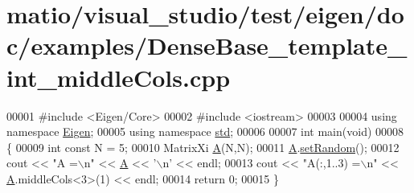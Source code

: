 \hypertarget{matio_2visual__studio_2test_2eigen_2doc_2examples_2_dense_base__template__int__middle_cols_8cpp_source}{}\section{matio/visual\+\_\+studio/test/eigen/doc/examples/\+Dense\+Base\+\_\+template\+\_\+int\+\_\+middle\+Cols.cpp}
\label{matio_2visual__studio_2test_2eigen_2doc_2examples_2_dense_base__template__int__middle_cols_8cpp_source}

\begin{DoxyCode}
00001 \textcolor{preprocessor}{#include <Eigen/Core>}
00002 \textcolor{preprocessor}{#include <iostream>}
00003 
00004 \textcolor{keyword}{using namespace }\hyperlink{namespace_eigen}{Eigen};
00005 \textcolor{keyword}{using namespace }\hyperlink{namespacestd}{std};
00006 
00007 \textcolor{keywordtype}{int} main(\textcolor{keywordtype}{void})
00008 \{
00009     \textcolor{keywordtype}{int} \textcolor{keyword}{const} N = 5;
00010     MatrixXi \hyperlink{group___core___module_class_eigen_1_1_matrix}{A}(N,N);
00011     \hyperlink{group___core___module_class_eigen_1_1_matrix}{A}.\hyperlink{class_eigen_1_1_plain_object_base_af0e576a0e1aefc9ee346de44cc352ba3}{setRandom}();
00012     cout << \textcolor{stringliteral}{"A =\(\backslash\)n"} << \hyperlink{group___core___module_class_eigen_1_1_matrix}{A} << \textcolor{charliteral}{'\(\backslash\)n'} << endl;
00013     cout << \textcolor{stringliteral}{"A(:,1..3) =\(\backslash\)n"} << \hyperlink{group___core___module_class_eigen_1_1_matrix}{A}.middleCols<3>(1) << endl;
00014     \textcolor{keywordflow}{return} 0;
00015 \}
\end{DoxyCode}
